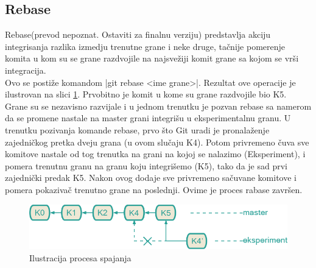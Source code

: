 \documentclass[a4paper]{article}
\begin{document}
{\subsection{Rebase}
\label{subsec:rebase}
Rebase(prevod nepoznat. Ostaviti za finalnu verziju) predstavlja akciju integrisanja razlika izmedju trenutne grane i neke druge, tačnije pomerenje komita u kom su se grane razdvojile na najsvežiji komit grane sa kojom se vrši integracija.\\
Ovo se postiže komandom |git rebase <ime grane>|. Rezultat ove operacije je ilustrovan na slici \ref{fig:rebase}. Prvobitno je komit u kome su grane razdvojile bio K5. Grane su se nezavisno razvijale i u jednom trenutku je pozvan rebase sa namerom da se promene nastale na master grani integrišu u eksperimentalnu granu. U trenutku pozivanja komande rebase, prvo što Git uradi je pronalaženje zajedničkog pretka dveju grana (u ovom slučaju K4). Potom privremeno čuva sve komitove nastale od tog trenutka na grani na kojoj se nalazimo (Eksperiment), i pomera trenutnu granu na granu koju integrišemo (K5), tako da je sad prvi zajednički predak K5. Nakon ovog dodaje sve privremeno sačuvane komitove i pomera pokazivač trenutno grane na poslednji. Ovime je proces rabase završen.
\begin{figure}[h!]
\begin{center}
\includegraphics[scale=0.3]{images/rebase.png}
\end{center}
\caption{Ilustracija procesa spajanja}
\label{fig:rebase}
\end{figure}

}
\end{document}

